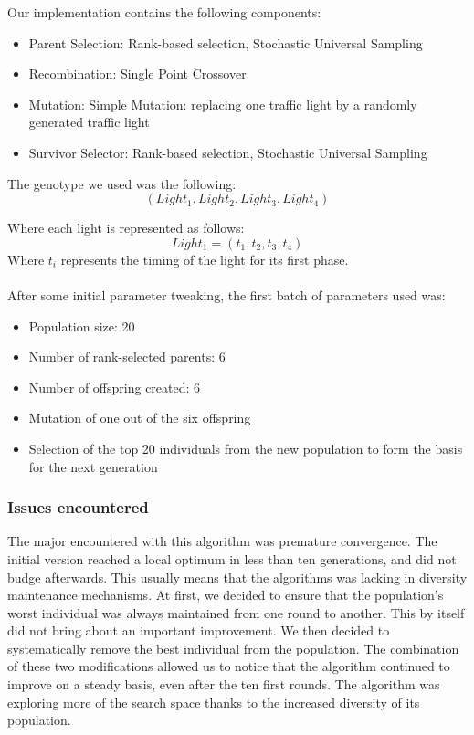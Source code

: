 \documentclass{article} %
\begin{document}
Our implementation contains the following components:
\begin{itemize}
 \item Parent Selection: Rank-based selection, Stochastic Universal Sampling
 \item Recombination: Single Point Crossover
 \item Mutation: Simple Mutation: replacing one traffic light by a randomly generated traffic light
 \item Survivor Selector: Rank-based selection, Stochastic Universal Sampling
\end{itemize}

The genotype we used was the following:
\begin{equation}
  (Light_1, Light_2, Light_3, Light_4)
\end{equation}

Where each light is represented as follows:
\begin{equation}
 Light_1 = (t_1, t_2, t_3, t_4)
\end{equation}
Where $t_i$ represents the timing of the light for its first phase. \\
$\;$\\
After some initial parameter tweaking, the first batch of parameters used was:
\begin{itemize}
 \item Population size: 20
 \item Number of rank-selected parents: 6
 \item Number of offspring created: 6
 \item Mutation of one out of the six offspring
 \item Selection of the top 20 individuals from the new population to form the basis for the next generation
\end{itemize}


\subsubsection{Issues encountered}
The major encountered with this algorithm was premature convergence. The initial version reached a local optimum in less than ten generations, and did not budge afterwards. This usually means that the algorithms was lacking in diversity maintenance mechanisms. At first, we decided to ensure that the population's worst individual was always maintained from one round to another. This by itself did not bring about an important improvement. 
We then decided to systematically remove the best individual from the population. The combination of these two modifications allowed us to notice that the algorithm continued to improve on a steady basis, even after the ten first rounds. The algorithm was exploring more of the search space thanks to the increased diversity of its population.
\end{document}
